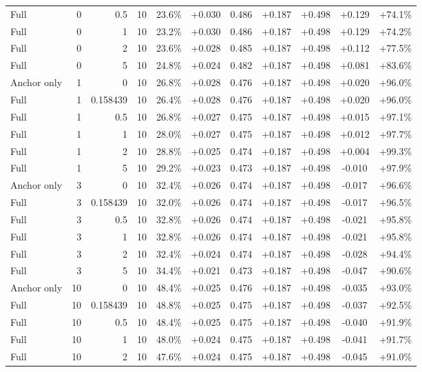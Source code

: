 \begin{table}[htbp]
\begin{tabular}{lrrrccccccc}
Full & 0 & 0.5 & 10 & 23.6\% & +0.030 & 0.486 & +0.187 & +0.498 & +0.129 & +74.1\% \\
Full & 0 & 1 & 10 & 23.2\% & +0.030 & 0.486 & +0.187 & +0.498 & +0.129 & +74.2\% \\
Full & 0 & 2 & 10 & 23.6\% & +0.028 & 0.485 & +0.187 & +0.498 & +0.112 & +77.5\% \\
Full & 0 & 5 & 10 & 24.8\% & +0.024 & 0.482 & +0.187 & +0.498 & +0.081 & +83.6\% \\
Anchor only & 1 & 0 & 10 & 26.8\% & +0.028 & 0.476 & +0.187 & +0.498 & +0.020 & +96.0\% \\
Full & 1 & 0.158439 & 10 & 26.4\% & +0.028 & 0.476 & +0.187 & +0.498 & +0.020 & +96.0\% \\
Full & 1 & 0.5 & 10 & 26.8\% & +0.027 & 0.475 & +0.187 & +0.498 & +0.015 & +97.1\% \\
Full & 1 & 1 & 10 & 28.0\% & +0.027 & 0.475 & +0.187 & +0.498 & +0.012 & +97.7\% \\
Full & 1 & 2 & 10 & 28.8\% & +0.025 & 0.474 & +0.187 & +0.498 & +0.004 & +99.3\% \\
Full & 1 & 5 & 10 & 29.2\% & +0.023 & 0.473 & +0.187 & +0.498 & -0.010 & +97.9\% \\
Anchor only & 3 & 0 & 10 & 32.4\% & +0.026 & 0.474 & +0.187 & +0.498 & -0.017 & +96.6\% \\
Full & 3 & 0.158439 & 10 & 32.0\% & +0.026 & 0.474 & +0.187 & +0.498 & -0.017 & +96.5\% \\
Full & 3 & 0.5 & 10 & 32.8\% & +0.026 & 0.474 & +0.187 & +0.498 & -0.021 & +95.8\% \\
Full & 3 & 1 & 10 & 32.8\% & +0.026 & 0.474 & +0.187 & +0.498 & -0.021 & +95.8\% \\
Full & 3 & 2 & 10 & 32.4\% & +0.024 & 0.474 & +0.187 & +0.498 & -0.028 & +94.4\% \\
Full & 3 & 5 & 10 & 34.4\% & +0.021 & 0.473 & +0.187 & +0.498 & -0.047 & +90.6\% \\
Anchor only & 10 & 0 & 10 & 48.4\% & +0.025 & 0.476 & +0.187 & +0.498 & -0.035 & +93.0\% \\
Full & 10 & 0.158439 & 10 & 48.8\% & +0.025 & 0.475 & +0.187 & +0.498 & -0.037 & +92.5\% \\
Full & 10 & 0.5 & 10 & 48.4\% & +0.025 & 0.475 & +0.187 & +0.498 & -0.040 & +91.9\% \\
Full & 10 & 1 & 10 & 48.0\% & +0.024 & 0.475 & +0.187 & +0.498 & -0.041 & +91.7\% \\
Full & 10 & 2 & 10 & 47.6\% & +0.024 & 0.475 & +0.187 & +0.498 & -0.045 & +91.0\% \\

\end{tabular}
\end{table}
